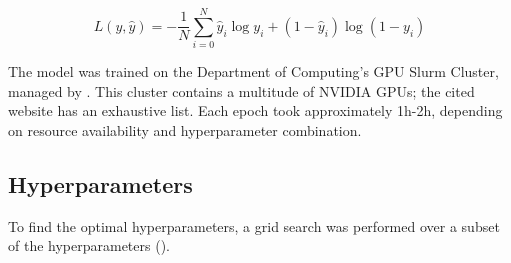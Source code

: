 \begin{equation}\label{bceEq}
  L(y, \hat{y}) = -\frac{1}{N}\sum_{i=0}^N \hat{y}_i \log y_i +
    (1-\hat{y}_i)\log(1-y_i)
\end{equation}

The model was trained on the Department of Computing's GPU Slurm Cluster,
managed by \citet{csgGPU}. This cluster contains a multitude of NVIDIA GPUs;
the cited website has an exhaustive list. Each epoch took approximately 1h-2h,
depending on resource availability and hyperparameter combination.

\subsection{Hyperparameters}\label{mlS22}

To find the optimal hyperparameters, a grid search was performed over a subset
of the hyperparameters ().

